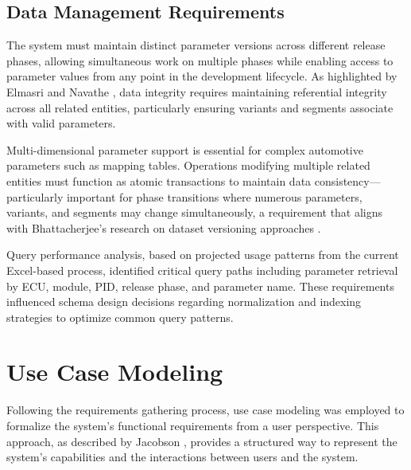 \subsection{Data Management Requirements}
\label{subsec:data-management-requirements}

The system must maintain distinct parameter versions across different release phases, allowing simultaneous work on multiple phases while enabling access to parameter values from any point in the development lifecycle. As highlighted by Elmasri and Navathe \cite{elmasri2015fundamentals}, data integrity requires maintaining referential integrity across all related entities, particularly ensuring variants and segments associate with valid parameters.

Multi-dimensional parameter support is essential for complex automotive parameters such as mapping tables. Operations modifying multiple related entities must function as atomic transactions to maintain data consistency—particularly important for phase transitions where numerous parameters, variants, and segments may change simultaneously, a requirement that aligns with Bhattacherjee's research on dataset versioning approaches \cite{bhattacherjee2015principles}.

Query performance analysis, based on projected usage patterns from the current Excel-based process, identified critical query paths including parameter retrieval by \ac{ECU}, module, PID, release phase, and parameter name. These requirements influenced schema design decisions regarding normalization and indexing strategies to optimize common query patterns.

\section{Use Case Modeling}
\label{sec:use-case-modeling}

Following the requirements gathering process, use case modeling was employed to formalize the system's functional requirements from a user perspective. This approach, as described by Jacobson \cite{jacobson2004use}, provides a structured way to represent the system's capabilities and the interactions between users and the system.

